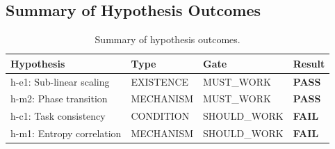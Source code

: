 \subsection{Summary of Hypothesis Outcomes}

\begin{table}[h]
\centering
\begin{tabular}{llll}
\toprule
\textbf{Hypothesis} & \textbf{Type} & \textbf{Gate} & \textbf{Result} \\
\midrule
h-e1: Sub-linear scaling & EXISTENCE & MUST\_WORK & \textbf{PASS} \\
h-m2: Phase transition & MECHANISM & MUST\_WORK & \textbf{PASS} \\
h-c1: Task consistency & CONDITION & SHOULD\_WORK & \textbf{FAIL} \\
h-m1: Entropy correlation & MECHANISM & SHOULD\_WORK & \textbf{FAIL} \\
\bottomrule
\end{tabular}
\caption{Summary of hypothesis outcomes.}
\label{tab:outcomes}
\end{table}
